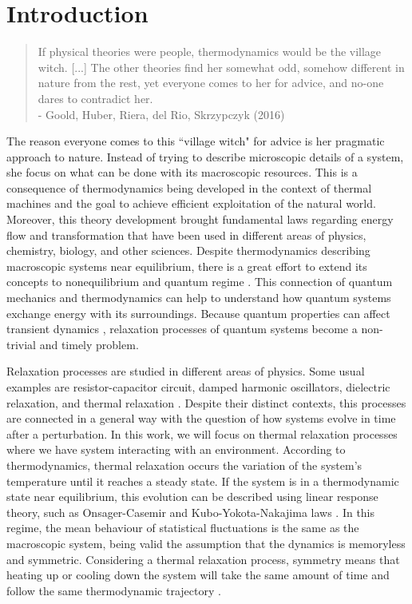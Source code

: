 

\chapter{Introduction}\label{cap:intro}

\begin{quote}
    If physical theories were people, thermodynamics would be the village witch. [...] The other theories find her somewhat odd, somehow different in nature from the rest, yet everyone comes to her for advice, and no-one dares to contradict her.\\
    - Goold, Huber, Riera, del Rio, Skrzypczyk (2016)
\end{quote}

The reason everyone comes to this ``village witch" for advice is her pragmatic approach to nature. Instead of trying to describe microscopic details of a system, she focus on what can be done with its macroscopic resources. This is a consequence of thermodynamics being developed in the context of thermal machines and the goal to achieve efficient exploitation of the natural world. Moreover, this theory development brought fundamental laws regarding energy flow and transformation that have been used in different areas of physics, chemistry, biology, and other sciences. Despite thermodynamics describing macroscopic systems near equilibrium, there is a great effort to extend its concepts to nonequilibrium and quantum regime \cite{goold-2016, vinjanampathy-2016, parrondo-2015, deffner-2019}. This connection of quantum mechanics and thermodynamics can help to understand how quantum systems exchange energy with its surroundings. Because quantum properties can affect transient dynamics \cite{petruccione-book, plenio-2008, deffner-2013}, relaxation processes of quantum systems become a non-trivial and timely problem.

Relaxation processes are studied in different areas of physics. Some usual examples are resistor-capacitor circuit, damped harmonic oscillators, dielectric relaxation, and thermal relaxation \cite{moyses-v2, moyses-v3, tipler-v1, tipler-v2, callen-book}. Despite their distinct contexts, this processes are connected in a general way with the question of how systems evolve in time after a perturbation. In this work, we will focus on thermal relaxation processes where we have system interacting with an environment. According to thermodynamics, thermal relaxation occurs the variation of the system's temperature until it reaches a steady state. If the system is in a thermodynamic state near equilibrium, this evolution can be described using linear response theory, such as Onsager-Casemir and Kubo-Yokota-Nakajima laws \cite{lapolla-2020}. In this regime, the mean behaviour of statistical fluctuations is the same as the macroscopic system, being valid the assumption that the dynamics is memoryless and symmetric. Considering a thermal relaxation process, symmetry means that heating up or cooling down the system will take the same amount of time and follow the same thermodynamic trajectory \cite{ibanez-2024, lapolla-2020, seifert-2012, groot-2013}.

